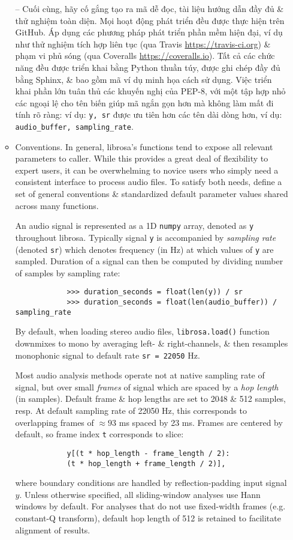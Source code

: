 \documentclass{article}
\begin{document}
\begin{itemize}
\begin{itemize}
		-- Cuối cùng, hãy cố gắng tạo ra mã dễ đọc, tài liệu hướng dẫn đầy đủ \& thử nghiệm toàn diện. Mọi hoạt động phát triển đều được thực hiện trên GitHub. Áp dụng các phương pháp phát triển phần mềm hiện đại, ví dụ như thử nghiệm tích hợp liên tục (qua Travis \url{https://travis-ci.org}) \& phạm vi phủ sóng (qua Coveralls \url{https://coveralls.io}). Tất cả các chức năng đều được triển khai bằng Python thuần túy, được ghi chép đầy đủ bằng Sphinx, \& bao gồm mã ví dụ minh họa cách sử dụng. Việc triển khai phần lớn tuân thủ các khuyến nghị của PEP-8, với một tập hợp nhỏ các ngoại lệ cho tên biến giúp mã ngắn gọn hơn mà không làm mất đi tính rõ ràng: ví dụ: {\tt y, sr} được ưu tiên hơn các tên dài dòng hơn, ví dụ: \verb|audio_buffer, sampling_rate|.
		\item {\sf Conventions.} In general, librosa's functions tend to expose all relevant parameters to caller. While this provides a great deal of flexibility to expert users, it can be overwhelming to novice users who simply need a consistent interface to process audio files. To satisfy both needs, define a set of general conventions \& standardized default parameter values shared across many functions.
		
		An audio signal is represented as a 1D {\tt numpy} array, denoted as {\tt y} throughout librosa. Typically signal {\tt y} is accompanied by {\it sampling rate} (denoted {\tt sr}) which denotes frequency (in Hz) at which values of {\tt y} are sampled. Duration of a signal can then be computed by dividing number of samples by sampling rate:
		\begin{verbatim}
			>>> duration_seconds = float(len(y)) / sr
			>>> duration_seconds = float(len(audio_buffer)) / sampling_rate
		\end{verbatim}
		By default, when loading stereo audio files, {\tt librosa.load()} function downmixes to mono by averaging left- \& right-channels, \& then resamples monophonic signal to default rate {\tt sr = 22050} Hz.
		
		Most audio analysis methods operate not at native sampling rate of signal, but over small {\it frames} of signal which are spaced by a {\it hop length} (in samples). Default frame \& hop lengths are set to 2048 \& 512 samples, resp. At default sampling rate of 22050 Hz, this corresponds to overlapping frames of $\approx93$ ms spaced by 23 ms. Frames are centered by default, so frame index {\tt t} corresponds to slice:
		\begin{verbatim}
			y[(t * hop_length - frame_length / 2):
			(t * hop_length + frame_length / 2)],
		\end{verbatim}
		where boundary conditions are handled by reflection-padding input signal $y$. Unless otherwise specified, all sliding-window analyses use Hann windows by default. For analyses that do not use fixed-width frames (e.g. constant-Q transform), default hop length of 512 is retained to facilitate alignment of results.
		

\end{itemize}
\end{itemize}
\end{document}
